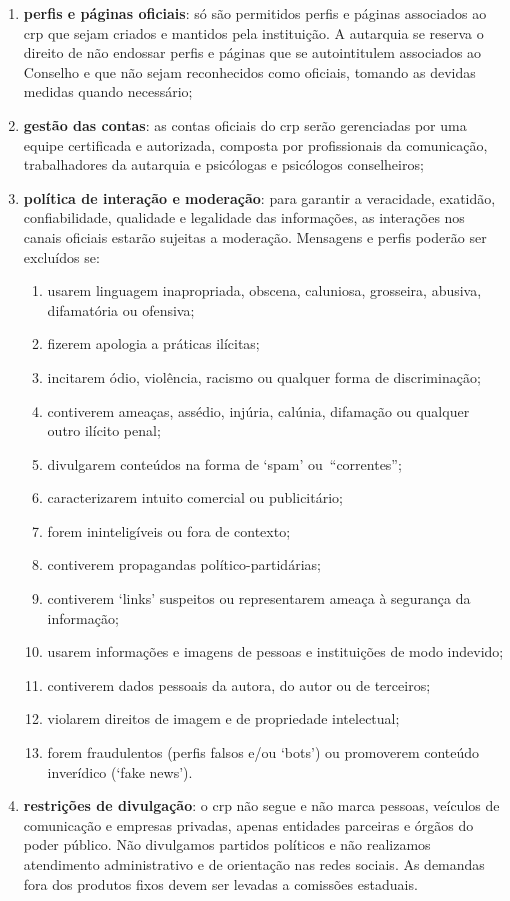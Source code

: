 \begin{enumerate}
	\def\labelenumi{\arabic{enumi}.}
	\item
	\textbf{perfis e páginas oficiais}: só são permitidos perfis e páginas
	associados ao \ac{crp} que sejam criados e mantidos pela instituição. A
	autarquia se reserva o direito de não endossar perfis e páginas que se
	autointitulem associados ao Conselho e que não sejam reconhecidos como
	oficiais, tomando as devidas medidas quando necessário;
	\item
	\textbf{gestão das contas}: as contas oficiais do \ac{crp} serão
	gerenciadas por uma equipe certificada e autorizada, composta por
	profissionais da comunicação, trabalhadores da autarquia e psicólogas
	e psicólogos conselheiros;
	\item
	\textbf{política de interação e moderação}: para garantir a
	veracidade, exatidão, confiabilidade, qualidade e legalidade das
	informações, as interações nos canais oficiais estarão sujeitas a
	moderação. Mensagens e perfis poderão ser excluídos se:

	\begin{enumerate}
		\def\labelenumii{\arabic{enumii}.}
		\item
		usarem linguagem inapropriada, obscena, caluniosa, grosseira,     abusiva, difamatória ou ofensiva;
		\item
		fizerem apologia a práticas ilícitas;
		\item
		incitarem ódio, violência, racismo ou qualquer forma de discriminação;
		\item
		contiverem ameaças, assédio, injúria, calúnia, difamação ou qualquer outro ilícito penal;
		\item
		divulgarem conteúdos na forma de `spam' ou~``correntes'';
		\item
		caracterizarem intuito comercial ou publicitário;
		\item
		forem ininteligíveis ou fora de contexto;
		\item
		contiverem propagandas político-partidárias;
		\item
		contiverem `links' suspeitos ou representarem ameaça à segurança da informação;
		\item
		usarem informações e imagens de pessoas e instituições de modo indevido;
		\item
		contiverem dados pessoais da autora, do autor ou de terceiros;
		\item
		violarem direitos de imagem e de propriedade intelectual;
		\item
		forem fraudulentos (perfis falsos e/ou `bots') ou promoverem conteúdo inverídico (`fake news').\\
	\end{enumerate}
	\item
	\textbf{restrições de divulgação}: o \ac{crp} não segue e não marca pessoas, veículos de comunicação e empresas privadas, apenas entidades parceiras e órgãos do poder público. Não divulgamos partidos políticos e não realizamos atendimento administrativo e de orientação nas redes sociais. As demandas fora dos produtos fixos devem ser levadas a
	comissões estaduais.
\end{enumerate}

